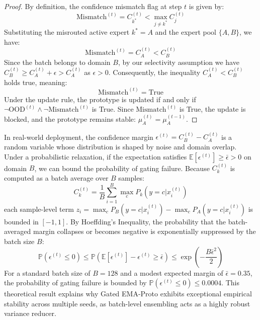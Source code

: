 \documentclass{article}
\theoremstyle{plain}
\theoremstyle{definition}
\theoremstyle{remark}
\begin{document}
\begin{proof}
By definition, the confidence mismatch flag at step $t$ is given by:
\begin{equation}
    \text{Mismatch}^{(t)} = C_{k^*}^{(t)} < \max_{j \neq k^*} C_j^{(t)}
\end{equation}
Substituting the misrouted active expert $k^* = A$ and the expert pool $\{A, B\}$, we have:
\begin{equation}
    \text{Mismatch}^{(t)} = C_A^{(t)} < C_B^{(t)}
\end{equation}
Since the batch belongs to domain $B$, by our selectivity assumption we have $C_B^{(t)} \ge C_A^{(t)} + \epsilon > C_A^{(t)}$ as $\epsilon > 0$. Consequently, the inequality $C_A^{(t)} < C_B^{(t)}$ holds true, meaning:
\begin{equation}
    \text{Mismatch}^{(t)} = \text{True}
\end{equation}
Under the update rule, the prototype is updated if and only if $\neg \text{OOD}^{(t)} \land \neg \text{Mismatch}^{(t)}$ is True. Since $\text{Mismatch}^{(t)}$ is True, the update is blocked, and the prototype remains stable: $\mu_A^{(t)} = \mu_A^{(t-1)}$.
\end{proof}

In real-world deployment, the confidence margin $\epsilon^{(t)} = C_B^{(t)} - C_A^{(t)}$ is a random variable whose distribution is shaped by noise and domain overlap. Under a probabilistic relaxation, if the expectation satisfies $\mathbb{E}[\epsilon^{(t)}] \ge \bar{\epsilon} > 0$ on domain $B$, we can bound the probability of gating failure. Because $C_k^{(t)}$ is computed as a batch average over $B$ samples:
\begin{equation}
    C_k^{(t)} = \frac{1}{B} \sum_{i=1}^B \max_c P_k(y=c | x_i^{(t)})
\end{equation}
each sample-level term $z_i = \max_c P_B(y=c|x_i^{(t)}) - \max_c P_A(y=c|x_i^{(t)})$ is bounded in $[-1, 1]$. By Hoeffding's Inequality, the probability that the batch-averaged margin collapses or becomes negative is exponentially suppressed by the batch size $B$:
\begin{equation}
    \mathbb{P}\left(\epsilon^{(t)} \le 0\right) \le \mathbb{P}\left( \mathbb{E}[\epsilon^{(t)}] - \epsilon^{(t)} \ge \bar{\epsilon} \right) \le \exp\left(-\frac{B \bar{\epsilon}^2}{2}\right)
\end{equation}
For a standard batch size of $B = 128$ and a modest expected margin of $\bar{\epsilon} = 0.35$, the probability of gating failure is bounded by $\mathbb{P}(\epsilon^{(t)} \le 0) \le 0.0004$. This theoretical result explains why Gated EMA-Proto exhibits exceptional empirical stability across multiple seeds, as batch-level ensembling acts as a highly robust variance reducer.
\end{document}
